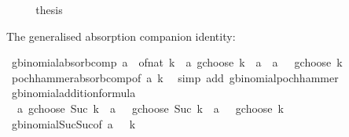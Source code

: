 \begin{isabellebody}
\ \ \isamarkupfalse%
\ \isamarkupfalse%
\ {\isacharquery}{\kern0pt}thesis\ \isacommand{{\isachardot}{\kern0pt}{\isachardot}{\kern0pt}}\isamarkupfalse%
\isanewline
{}\isamarkupfalse%
%
\endisatagproof
{\isafoldproof}%
%
\isadelimproof
%
\endisadelimproof
%
\begin{isamarkuptext}%
The generalised absorption companion identity:%
\end{isamarkuptext}\isamarkuptrue%
\isamarkupfalse%
\ gbinomial{\isacharunderscore}{\kern0pt}absorb{\isacharunderscore}{\kern0pt}comp{\isacharcolon}{\kern0pt}\ {\isachardoublequoteopen}{\isacharparenleft}{\kern0pt}a\ {\isacharminus}{\kern0pt}\ of{\isacharunderscore}{\kern0pt}nat\ k{\isacharparenright}{\kern0pt}\ {\isacharasterisk}{\kern0pt}\ {\isacharparenleft}{\kern0pt}a\ gchoose\ k{\isacharparenright}{\kern0pt}\ {\isacharequal}{\kern0pt}\ a\ {\isacharasterisk}{\kern0pt}\ {\isacharparenleft}{\kern0pt}{\isacharparenleft}{\kern0pt}a\ {\isacharminus}{\kern0pt}\ {}{\isacharparenright}{\kern0pt}\ gchoose\ k{\isacharparenright}{\kern0pt}{\isachardoublequoteclose}\isanewline
%
\isadelimproof
\ \ %
\endisadelimproof
%
\isatagproof
{}\isamarkupfalse%
\ pochhammer{\isacharunderscore}{\kern0pt}absorb{\isacharunderscore}{\kern0pt}comp{\isacharbrackleft}{\kern0pt}of\ a\ k{\isacharbrackright}{\kern0pt}\ \isamarkupfalse%
\ {\isacharparenleft}{\kern0pt}simp\ add{\isacharcolon}{\kern0pt}\ gbinomial{\isacharunderscore}{\kern0pt}pochhammer{\isacharparenright}{\kern0pt}%
\endisatagproof
{\isafoldproof}%
%
\isadelimproof
\isanewline
%
\endisadelimproof
\isanewline
{}\isamarkupfalse%
\ gbinomial{\isacharunderscore}{\kern0pt}addition{\isacharunderscore}{\kern0pt}formula{\isacharcolon}{\kern0pt}\isanewline
\ \ {\isachardoublequoteopen}a\ gchoose\ {\isacharparenleft}{\kern0pt}Suc\ k{\isacharparenright}{\kern0pt}\ {\isacharequal}{\kern0pt}\ {\isacharparenleft}{\kern0pt}{\isacharparenleft}{\kern0pt}a\ {\isacharminus}{\kern0pt}\ {}{\isacharparenright}{\kern0pt}\ gchoose\ {\isacharparenleft}{\kern0pt}Suc\ k{\isacharparenright}{\kern0pt}{\isacharparenright}{\kern0pt}\ {\isacharplus}{\kern0pt}\ {\isacharparenleft}{\kern0pt}{\isacharparenleft}{\kern0pt}a\ {\isacharminus}{\kern0pt}\ {}{\isacharparenright}{\kern0pt}\ gchoose\ k{\isacharparenright}{\kern0pt}{\isachardoublequoteclose}\isanewline
%
\isadelimproof
\ \ %
\endisadelimproof
%
\isatagproof
{}\isamarkupfalse%
\ gbinomial{\isacharunderscore}{\kern0pt}Suc{\isacharunderscore}{\kern0pt}Suc{\isacharbrackleft}{\kern0pt}of\ {\isachardoublequoteopen}a\ {\isacharminus}{\kern0pt}\ {}{\isachardoublequoteclose}\ k{\isacharbrackright}{\kern0pt}\ \isamarkupfalse%

\end{isabellebody}

